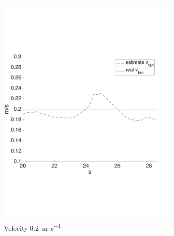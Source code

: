 \begin{figure}[!htbp]
\begin{subfigure}[b]{0.45\textwidth}
        \includegraphics[width=\textwidth]{img/tag_moving_real_world_vel.pdf}
        \caption{Velocity \SI{0.2}{\meter \per \second}}
        \label{fig:two_ekf_real_world_moving}
   \end{subfigure}
    \centering
   \begin{subfigure}[b]{0.45\textwidth}

\end{subfigure}
\end{figure}
